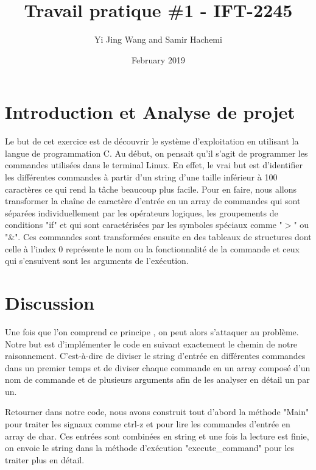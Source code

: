 \documentclass{article}
\title{Travail pratique \#1 - IFT-2245}
\author{Yi Jing Wang and Samir Hachemi }
\date{February 2019}
\begin{document}
\maketitle

\section{Introduction et Analyse de projet}
Le but de cet exercice est de découvrir le système d'exploitation en utilisant la langue de programmation C. Au début, on pensait qu'il s'agit de programmer les commandes utilisées dans le terminal Linux. En effet, le vrai but est d'identifier les différentes commandes à partir d'un string d'une taille inférieur à 100 caractères ce qui rend la tâche beaucoup plus facile. Pour en faire, nous allons transformer la chaîne de caractère d'entrée en un array de commandes qui sont séparées individuellement par les opérateurs logiques, les groupements de conditions "if" et qui sont caractérisées par les symboles spéciaux comme "$>$" ou "\&". Ces commandes sont transformées ensuite en des tableaux de structures dont celle à l'index 0 représente le nom ou la fonctionnalité de la commande et ceux qui s'ensuivent sont les arguments de l'exécution.

\section{Discussion}

Une fois que l'on comprend ce principe , on peut alors s'attaquer au problème. Notre but est d'implémenter le code en suivant exactement le chemin de notre raisonnement. C'est-à-dire de diviser le string d'entrée en différentes commandes dans un premier temps et de diviser chaque commande en un array composé d'un nom de commande et de plusieurs arguments afin de les analyser en détail un par un.



Retourner dans notre code, nous avons construit tout d'abord la méthode "Main" pour traiter les signaux comme ctrl-z et pour lire les commandes d'entrée en array de char. Ces entrées sont combinées en string et une fois la lecture est finie, on envoie le string dans la méthode d'exécution "execute\_command" pour les traiter plus en détail.
\end{document}
